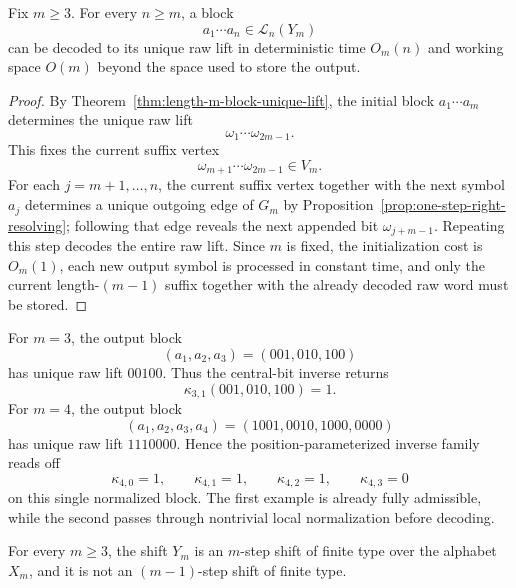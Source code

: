 \begin{corollary}
\label{cor:linear-time-block-decoding}
Fix $m\ge 3$.  For every $n\ge m$, a block
\[
a_1\cdots a_n\in\mathcal L_n(Y_m)
\]
can be decoded to its unique raw lift in deterministic time $O_m(n)$ and
working space $O(m)$ beyond the space used to store the output.
\end{corollary}

\begin{proof}
By Theorem~\ref{thm:length-m-block-unique-lift}, the initial block
$a_1\cdots a_m$ determines the unique raw lift
\[
\omega_1\cdots\omega_{2m-1}.
\]
This fixes the current suffix vertex
\[
\omega_{m+1}\cdots\omega_{2m-1}\in V_m.
\]
For each $j=m+1,\ldots,n$, the current suffix vertex together with the next
symbol $a_j$ determines a unique outgoing edge of $G_m$ by
Proposition~\ref{prop:one-step-right-resolving}; following that edge reveals
the next appended bit $\omega_{j+m-1}$.  Repeating this step decodes the entire
raw lift.  Since $m$ is fixed, the initialization cost is $O_m(1)$, each new
output symbol is processed in constant time, and only the current
length-$(m-1)$ suffix together with the already decoded raw word must be
stored.
\end{proof}

\begin{remark}
\label{rem:small-decoding-examples}
For $m=3$, the output block
\[
(a_1,a_2,a_3)=(001,010,100)
\]
has unique raw lift $00100$.  Thus the central-bit inverse returns
\[
\kappa_{3,1}(001,010,100)=1.
\]
For $m=4$, the output block
\[
(a_1,a_2,a_3,a_4)=(1001,0010,1000,0000)
\]
has unique raw lift $1110000$.  Hence the position-parameterized inverse family
reads off
\[
\kappa_{4,0}=1,\qquad
\kappa_{4,1}=1,\qquad
\kappa_{4,2}=1,\qquad
\kappa_{4,3}=0
\]
on this single normalized block.  The first example is already fully
admissible, while the second passes through nontrivial local normalization
before decoding.
\end{remark}

\begin{theorem}
\label{thm:Y-m-exact-SFT-order}
For every $m\ge 3$, the shift $Y_m$ is an $m$-step shift of finite type over
the alphabet $X_m$, and it is not an $(m-1)$-step shift of finite type.
\end{theorem}

